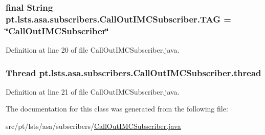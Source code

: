 \hypertarget{classpt_1_1lsts_1_1asa_1_1subscribers_1_1CallOutIMCSubscriber_a2b6c7fc2e5cdeec64fc445027f712ea2}{}
\subsubsection[{T\+A\+G}]{\setlength{\rightskip}{0pt plus 5cm}final String pt.\+lsts.\+asa.\+subscribers.\+Call\+Out\+I\+M\+C\+Subscriber.\+T\+A\+G = \char`\"{}Call\+Out\+I\+M\+C\+Subscriber\char`\"{}\hspace{0.3cm}{\ttfamily [private]}}\label{classpt_1_1lsts_1_1asa_1_1subscribers_1_1CallOutIMCSubscriber_a2b6c7fc2e5cdeec64fc445027f712ea2}


Definition at line 20 of file Call\+Out\+I\+M\+C\+Subscriber.\+java.

\hypertarget{classpt_1_1lsts_1_1asa_1_1subscribers_1_1CallOutIMCSubscriber_aace2fb8bba8612981525f30239ab194c}{}
\subsubsection[{thread}]{\setlength{\rightskip}{0pt plus 5cm}Thread pt.\+lsts.\+asa.\+subscribers.\+Call\+Out\+I\+M\+C\+Subscriber.\+thread\hspace{0.3cm}{\ttfamily [private]}}\label{classpt_1_1lsts_1_1asa_1_1subscribers_1_1CallOutIMCSubscriber_aace2fb8bba8612981525f30239ab194c}


Definition at line 21 of file Call\+Out\+I\+M\+C\+Subscriber.\+java.



The documentation for this class was generated from the following file\+:\begin{DoxyCompactItemize}
\item 
src/pt/lsts/asa/subscribers/\hyperlink{CallOutIMCSubscriber_8java}{Call\+Out\+I\+M\+C\+Subscriber.\+java}\end{DoxyCompactItemize}
